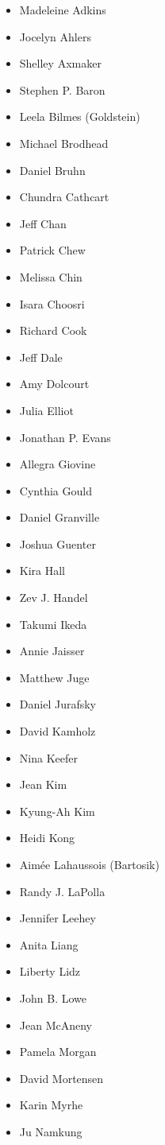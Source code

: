 \begin{itemize}
\item Madeleine Adkins
\item Jocelyn Ahlers
\item Shelley Axmaker
\item Stephen P. Baron
\item Leela Bilmes (Goldstein)
\item Michael Brodhead
\item Daniel Bruhn
\item Chundra Cathcart
\item Jeff Chan
\item Patrick Chew
\item Melissa Chin
\item Isara Choosri
\item Richard Cook
\item Jeff Dale
\item Amy Dolcourt
\item Julia Elliot
\item Jonathan P. Evans
\item Allegra Giovine
\item Cynthia Gould
\item Daniel Granville
\item Joshua Guenter
\item Kira Hall
\item Zev J. Handel
\item Takumi Ikeda
\item Annie Jaisser
\item Matthew Juge
\item Daniel Jurafsky
\item David Kamholz
\item Nina Keefer
\item Jean Kim
\item Kyung-Ah Kim
\item Heidi Kong
\item Aim\'ee Lahaussois (Bartosik)
\item Randy J. LaPolla
\item Jennifer Leehey
\item Anita Liang
\item Liberty Lidz
\item John B. Lowe
\item Jean McAneny
\item Pamela Morgan
\item David Mortensen
\item Karin Myrhe
\item Ju Namkung

\end{itemize}
